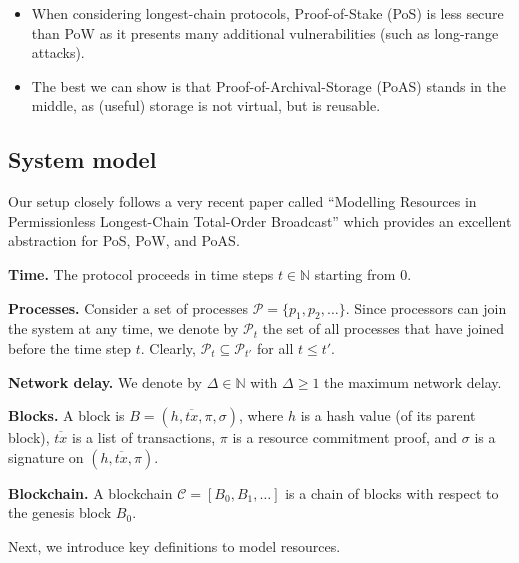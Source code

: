 \documentclass[12pt,draftcls,onecolumn]{IEEEtran}
\begin{document}
\begin{itemize}
    \item When considering longest-chain protocols, Proof-of-Stake (PoS) is less secure than PoW as it presents many additional vulnerabilities (such as long-range attacks). 
    \item The best we can show is that Proof-of-Archival-Storage (PoAS) stands in the middle, as (useful) storage is not virtual, but is reusable.
\end{itemize}

\subsection{System model}







Our setup closely follows a very recent paper called ``Modelling Resources in Permissionless Longest-Chain Total-Order Broadcast'' which provides an excellent abstraction for PoS, PoW, and PoAS.


{\bf Time.} The protocol proceeds in time steps $t \in \mathbb{N}$ starting from $0$.

{\bf Processes.} Consider a set of processes $\mathcal{P} = \{ p_1, p_2, \ldots \}$. Since processors can join the system at any time,
we denote by $\mathcal{P}_t$ the set of all processes that have joined before the time step $t$. Clearly, $\mathcal{P}_t \subseteq \mathcal{P}_{t'}$ 
for all $t \le t'$.

{\bf Network delay.} We denote by $\Delta \in \mathbb{N}$ with $\Delta \ge 1$ the maximum network delay.

{\bf Blocks.} A block is $B = (h, \overline{tx}, \pi, \sigma)$, where $h$ is a hash value (of its parent block), $\overline{tx}$ is a list of transactions,
$\pi$ is a resource commitment proof, and $\sigma$ is a signature on $(h, \overline{tx}, \pi)$.

{\bf Blockchain.} A blockchain $\mathcal{C} = [B_0, B_1, \ldots]$ is a chain of blocks with respect to the genesis block $B_0$.

Next, we introduce key definitions to model resources.
\end{document}
